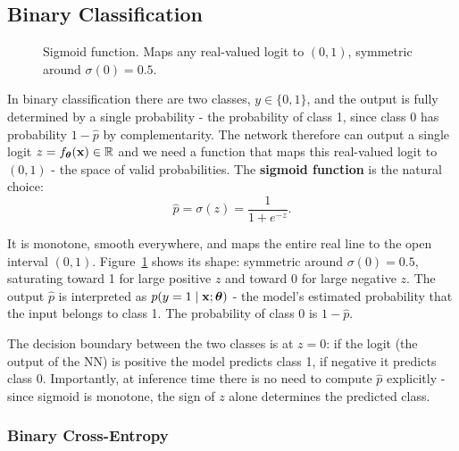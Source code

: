 \subsection{Binary Classification}\label{sec:bce}

\begin{figure}
\centering
{}
\resizebox{0.33\textwidth}{!}{}
\caption{Sigmoid function. Maps any real-valued logit to $(0,1)$, symmetric around $\sigma(0) = 0.5$.}
\label{fig:sigmoid}
\end{figure}

In binary classification there are two classes, $y \in \{0, 1\}$, and the output is fully determined by a single probability - the probability of class 1, since class 0 has probability $1 - \hat{p}$ by complementarity. The network therefore can output a single logit $z = f_{\boldsymbol{\theta}}(\mathbf{x}) \in \mathbb{R}$ and we need a function that maps this real-valued logit to $(0, 1)$ - the space of valid probabilities. The \textbf{sigmoid function} is the natural choice:
\begin{equation}\label{eq:sigmoid}
    \hat{p} = \sigma(z) = \frac{1}{1 + e^{-z}}.
\end{equation}



It is monotone, smooth everywhere, and maps the entire real line to the open interval $(0,1)$. Figure~\ref{fig:sigmoid} shows its shape: symmetric around $\sigma(0) = 0.5$, saturating toward 1 for large positive $z$ and toward 0 for large negative $z$. The output $\hat{p}$ is interpreted as $p(y=1 \mid \mathbf{x}; \boldsymbol{\theta})$ - the model's estimated probability that the input belongs to class 1. The probability of class 0 is $1-\hat{p}$.

The decision boundary between the two classes is at $z = 0$: if the logit (the output of the NN) is positive the model predicts class 1, if negative it predicts class 0. Importantly, at inference time there is no need to compute $\hat{p}$ explicitly - since sigmoid is monotone, the sign of $z$ alone determines the predicted class.

\subsubsection{Binary Cross-Entropy}

